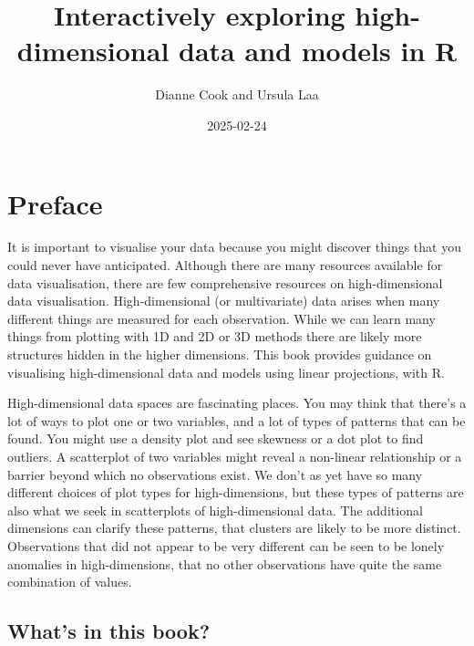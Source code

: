 \documentclass[
  letterpaper,
]{krantz}
\title{Interactively exploring high-dimensional data and models in R}
\author{Dianne Cook and Ursula Laa}
\date{2025-02-24}
\renewcommand*\contentsname{Table of contents}
\newcommand\contentsname{Table of contents}
\begin{document}
\maketitle

\renewcommand*\contentsname{Contents}
{
\hypersetup{linkcolor=}
\setcounter{tocdepth}{2}
\tableofcontents
}


\chapter*{Preface}\label{preface}


It is important to visualise your data because you might discover things
that you could never have anticipated. Although there are many resources
available for data visualisation, there are few comprehensive resources
on high-dimensional data visualisation. High-dimensional (or
multivariate) data arises when many different things are measured for
each observation. While we can learn many things from plotting with 1D
and 2D or 3D methods there are likely more structures hidden in the
higher dimensions. This book provides guidance on visualising
high-dimensional data and models using linear projections, with R.

High-dimensional data spaces are fascinating places. You may think that
there's a lot of ways to plot one or two variables, and a lot of types
of patterns that can be found. You might use a density plot and see
skewness or a dot plot to find outliers. A scatterplot of two variables
might reveal a non-linear relationship or a barrier beyond which no
observations exist. We don't as yet have so many different choices of
plot types for high-dimensions, but these types of patterns are also
what we seek in scatterplots of high-dimensional data. The additional
dimensions can clarify these patterns, that clusters are likely to be
more distinct. Observations that did not appear to be very different can
be seen to be lonely anomalies in high-dimensions, that no other
observations have quite the same combination of values.

\section*{What's in this book?}\label{whats-in-this-book}

\end{document}

